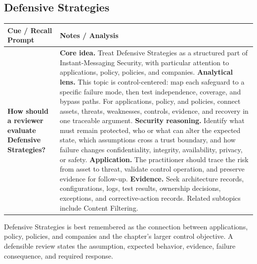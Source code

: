 \documentclass[11pt]{article}
\newcommand{\CornellHeader}{%
\rowcolor{Navy}\color{white}\bfseries Cue / Recall Prompt & \color{white}\bfseries Notes / Analysis\\\hline}
\newcommand{\CornellRow}[2]{%
\cellcolor{CueGray}\RaggedRight\textbf{#1} & \RaggedRight #2\\\hline}
\begin{document}
\subsection*{Defensive Strategies}
\begin{longtable}{>{\RaggedRight\arraybackslash}p{}|>{\RaggedRight\arraybackslash}p{}}
\CornellHeader
\CornellRow{How should a reviewer evaluate Defensive Strategies?}{\textbf{Core idea.} Treat Defensive Strategies as a structured part of Instant-Messaging Security, with particular attention to applications, policy, policies, and companies. \textbf{Analytical lens.} This topic is control-centered: map each safeguard to a specific failure mode, then test independence, coverage, and bypass paths. For applications, policy, and policies, connect assets, threats, weaknesses, controls, evidence, and recovery in one traceable argument. \textbf{Security reasoning.} Identify what must remain protected, who or what can alter the expected state, which assumptions cross a trust boundary, and how failure changes confidentiality, integrity, availability, privacy, or safety. \textbf{Application.} The practitioner should trace the risk from asset to threat, validate control operation, and preserve evidence for follow-up. \textbf{Evidence.} Seek architecture records, configurations, logs, test results, ownership decisions, exceptions, and corrective-action records. Related subtopics include Content Filtering.}
\end{longtable}
\begin{topicsummary}
Defensive Strategies is best remembered as the connection between applications, policy, policies, and companies and the chapter's larger control objective. A defensible review states the assumption, expected behavior, evidence, failure consequence, and required response.
\end{topicsummary}
\end{document}
